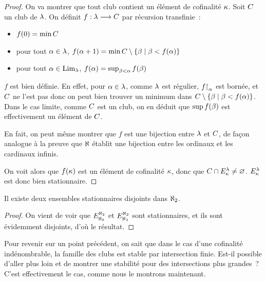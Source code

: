 \begin{proof}
  On va montrer que tout club contient un élément de cofinalité $\kappa$. Soit
  $C$ un club de $\lambda$. On définit
  $f : \displaystyle \lambda \longrightarrow C$ par récursion transfinie~:
  \begin{itemize}
  \item $f(0) = \min C$
  \item pour tout $\alpha \in \lambda$,
    $f(\alpha + 1) = \min C\setminus \left\{ \beta \;\middle\vert\; \beta < f(\alpha) \right\}$
  \item pour tout $\alpha \in \operatorname{Lim}_\lambda$,
    $f(\alpha) = \sup_{\beta < \alpha} f(\beta)$
  \end{itemize}

  $f$ est bien définie. En effet, pour $\alpha \in \lambda$, comme $\lambda$ est
  régulier, $f\mathbin{\upharpoonright}_{\alpha}$ est bornée, et $C$ ne l'est pas donc on peut
  bien trouver un minimum dans
  $C\setminus \left\{ \beta \;\middle\vert\; \beta < f(\alpha) \right\}$. Dans le cas limite,
  comme $C$ est un club, on en déduit que $\sup f(\beta)$ est
  effectivement un élément de $C$.

  En fait, on peut même montrer que $f$ est une bijection entre $\lambda$ et
  $C$, de façon analogue à la preuve que $\aleph$ établit une bijection
  entre les ordinaux et les cardinaux infinis.

  On voit alors que $f(\kappa)$ est un élément de cofinalité $\kappa$, donc que
  $C\cap E_{\kappa}^{\lambda} \neq \varnothing$. $E_{\kappa}^{\lambda}$ est
  donc bien stationnaire.
\end{proof}

\begin{corollary}\label{cor.al2.deuxdis}
  Il existe deux ensembles stationnaires disjoints dans $\aleph_2$.
\end{corollary}

\begin{proof}
  On vient de voir que $E_{\aleph_0}^{\aleph_2}$ et $E_{\aleph_1}^{\aleph_2}$ sont
  stationnaires, et ils sont évidemment disjoints, d'où le résultat.
\end{proof}

Pour revenir sur un point précédent, on sait que dans le cas d'une cofinalité
indénombrable, la famille des clubs est stable par intersection finie. Est-il
possible d'aller plus loin et de montrer une stabilité pour des intersections
plus grandes~? C'est effectivement le cas, comme nous le montrons maintenant.

